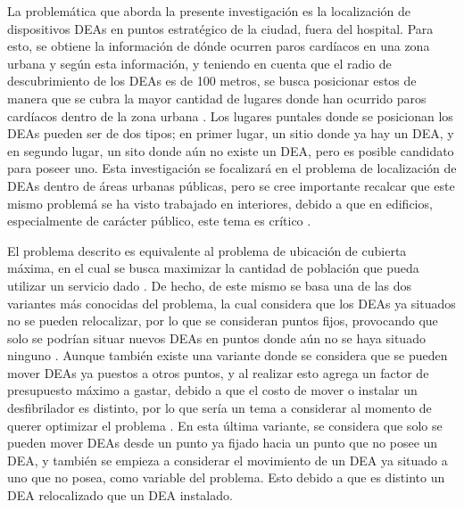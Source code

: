 \documentclass[letter, 10pt]{article}
\begin{document}
La problem\'atica que aborda la presente investigaci\'on es la localizaci\'on de dispositivos DEAs en puntos estrat\'egico de la ciudad, fuera del hospital. Para esto, se obtiene la informaci\'on de d\'onde ocurren paros card\'iacos en una zona urbana y seg\'un esta informaci\'on, y teniendo en cuenta que el radio de descubrimiento de los DEAs es de 100 metros, se busca posicionar estos de manera que se cubra la mayor cantidad de lugares donde han ocurrido paros card\'iacos dentro de la zona urbana \cite{Chan}. Los lugares puntales donde se posicionan los DEAs pueden ser de dos tipos; en primer lugar, un sitio donde ya hay un DEA, y en segundo lugar, un sito donde a\'un no existe un DEA, pero es posible candidato para poseer uno. Esta investigaci\'on se focalizar\'a en el problema de localizaci\'on de DEAs dentro de \'areas urbanas p\'ublicas, pero se cree importante recalcar que este mismo problem\'a se ha visto trabajado en interiores, debido a que en edificios, especialmente de car\'acter p\'ublico, este tema es cr\'itico \cite{Dao}.

El problema descrito es equivalente al problema de ubicaci\'on de cubierta m\'axima, en el cual se busca maximizar la cantidad de poblaci\'on que pueda utilizar un servicio dado \cite{Church}. De hecho, de este mismo se basa una de las dos variantes m\'as conocidas del problema, la cual considera que los DEAs ya situados no se pueden relocalizar, por lo que se consideran puntos fijos, provocando que solo se podr\'ian situar nuevos DEAs en puntos donde a\'un no se haya situado ninguno \cite{ChanDemir}. Aunque tambi\'en existe una variante donde se considera que se pueden mover DEAs ya puestos a otros puntos, y al realizar esto agrega un factor de presupuesto m\'aximo a gastar, debido a que el costo de mover o instalar un desfibrilador es distinto, por lo que ser\'ia un tema a considerar al momento de querer optimizar el problema \cite{Tierney}. En esta \'ultima variante, se considera que solo se pueden mover DEAs desde un punto ya fijado hacia un punto que no posee un DEA, y tambi\'en se empieza a considerar el movimiento de un DEA ya situado a uno que no posea, como variable del problema. Esto debido a que es distinto un DEA relocalizado que un DEA instalado. 
\end{document}
